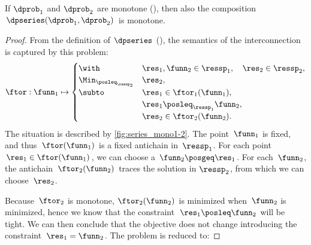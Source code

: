 \begin{proposition}
\label{pro:series-monotone}If $\dprob_{1}$ and $\dprob_{2}$ are
monotone (), then also the composition $\dpseries(\dprob_{1},\dprob_{2})$
is monotone.
\end{proposition}
\begin{proof}
From the definition of $\dpseries$ (),
the semantics of the interconnection is captured by this problem:
\begin{equation}
\ftor:\funn_{1}\mapsto\begin{cases}
\with & \res_{1},\funn_{2}\in\ressp_{1},\quad\res_{2}\in\ressp_{2},\\
\Min_{\posleq_{\ressp_{2}}} & \res_{2},\\
\subto & \res_{1}\in\ftor_{1}(\funn_{1}),\\
 & \res_{1}\posleq_{\ressp_{1}}\funn_{2},\\
 & \res_{2}\in\ftor_{2}(\funn_{2}).
\end{cases}\label{eq:dede}
\end{equation}
The situation is described by \cref{fig:series_mono1-2}. The point~$\funn_{1}$
is fixed, and thus~$\ftor(\funn_{1})$ is a fixed antichain in~$\ressp_{1}$.
For each point $\res_{1}\in\ftor(\funn_{1})$, we can choose a $\funn_{2}\posgeq\res_{1}$.
For each~$\funn_{2}$, the antichain~$\ftor_{2}(\funn_{2})$ traces
the solution in $\ressp_{2}$, from which we can choose~$\res_{2}$. 


\noindent Because~$\ftor_{2}$ is monotone, $\ftor_{2}(\funn_{2})$
is minimized when~$\funn_{2}$ is minimized, hence we know that the
constraint~$\res_{1}\posleq\funn_{2}$ will be tight. We can then
conclude that the objective does not change introducing the constraint~$\res_{1}=\funn_{2}$.
The problem is reduced to:


\end{proof}
